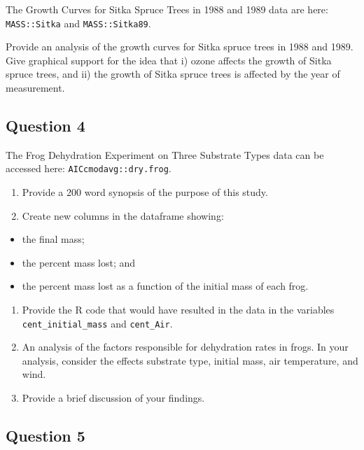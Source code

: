 \documentclass[
  10t,
]{article}
\providecommand{\tightlist}{%
  \setlength{\itemsep}{0pt}\setlength{\parskip}{0pt}}\usepackage{longtable,booktabs,array}
\begin{document}
The Growth Curves for Sitka Spruce Trees in 1988 and 1989 data are here:
\texttt{MASS::Sitka} and \texttt{MASS::Sitka89}.

Provide an analysis of the growth curves for Sitka spruce trees in 1988
and 1989. Give graphical support for the idea that i) ozone affects the
growth of Sitka spruce trees, and ii) the growth of Sitka spruce trees
is affected by the year of measurement.

\subsection{Question 4}\label{question-4-1}

The Frog Dehydration Experiment on Three Substrate Types data can be
accessed here: \texttt{AICcmodavg::dry.frog}.

\begin{enumerate}
\def\labelenumi{\alph{enumi}.}
\tightlist
\item
  Provide a 200 word synopsis of the purpose of this study.
\item
  Create new columns in the dataframe showing:
\end{enumerate}

\begin{itemize}
\tightlist
\item
  the final mass;
\item
  the percent mass lost; and
\item
  the percent mass lost as a function of the initial mass of each frog.
\end{itemize}

\begin{enumerate}
\def\labelenumi{\alph{enumi}.}
\setcounter{enumi}{2}
\tightlist
\item
  Provide the R code that would have resulted in the data in the
  variables \texttt{cent\_initial\_mass} and \texttt{cent\_Air}.
\item
  An analysis of the factors responsible for dehydration rates in frogs.
  In your analysis, consider the effects substrate type, initial mass,
  air temperature, and wind.
\item
  Provide a brief discussion of your findings.
\end{enumerate}

\subsection{Question 5}\label{question-5-1}
\end{document}
